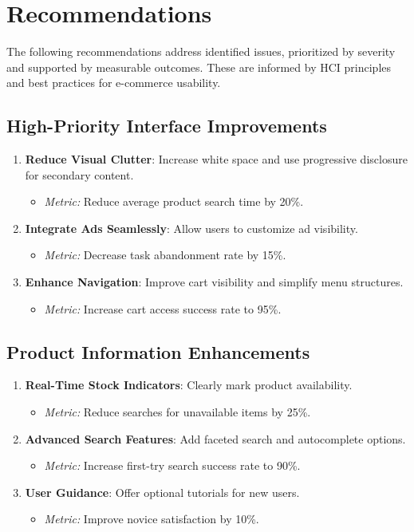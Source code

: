 \documentclass[conference]{IEEEtran}
\begin{document}
\section{Recommendations}
The following recommendations address identified issues, prioritized by severity and supported by measurable outcomes. These are informed by HCI principles and best practices for e-commerce usability.

\subsection{High-Priority Interface Improvements}
\begin{enumerate}
    \item \textbf{Reduce Visual Clutter}: Increase white space and use progressive disclosure for secondary content.
    \begin{itemize}
        \item \textit{Metric:} Reduce average product search time by 20\%.
    \end{itemize}
    \item \textbf{Integrate Ads Seamlessly}: Allow users to customize ad visibility.
    \begin{itemize}
        \item \textit{Metric:} Decrease task abandonment rate by 15\%.
    \end{itemize}
    \item \textbf{Enhance Navigation}: Improve cart visibility and simplify menu structures.
    \begin{itemize}
        \item \textit{Metric:} Increase cart access success rate to 95\%.
    \end{itemize}
\end{enumerate}

\subsection{Product Information Enhancements}
\begin{enumerate}
    \item \textbf{Real-Time Stock Indicators}: Clearly mark product availability.
    \begin{itemize}
        \item \textit{Metric:} Reduce searches for unavailable items by 25\%.
    \end{itemize}
    \item \textbf{Advanced Search Features}: Add faceted search and autocomplete options.
    \begin{itemize}
        \item \textit{Metric:} Increase first-try search success rate to 90\%.
    \end{itemize}
    \item \textbf{User Guidance}: Offer optional tutorials for new users.
    \begin{itemize}
        \item \textit{Metric:} Improve novice satisfaction by 10\%.
    \end{itemize}
\end{enumerate}
\end{document}
